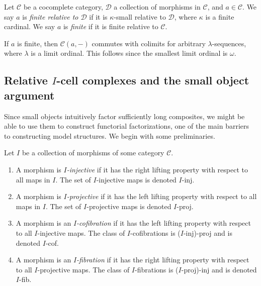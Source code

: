 \begin{definition}\label{4.1.6}
	Let $\mathcal{C} $ be a cocomplete category, $\mathcal{D} $ a collection of morphisms in $\mathcal{C} $, and $a\in \mathcal{C} $. We say $a$ is \emph{finite relative to $\mathcal{D} $} if it is $\kappa $-small relative to $\mathcal{D} $, where $\kappa $ is a finite cardinal. We say $a$ is \emph{finite} if it is finite relative to $\mathcal{C} $.
\end{definition}

If $a$ is finite, then $\mathcal{C} (a,-)$ commutes with colimits for arbitrary $\lambda $-sequences, where $\lambda $ is a limit ordinal. This follows since the smallest limit ordinal is $\omega $.

\subsection{Relative $I$-cell complexes and the small object argument}

Since small objects intuitively factor sufficiently long composites, we might be able to use them to construct functorial factorizations, one of the main barriers to constructing model structures. We begin with some preliminaries.

\begin{definition}\label{4.1.7}
	Let $I$ be a collection of morphisms of some category $\mathcal{C} $.
	\begin{enumerate}
		\item A morphism is \emph{$I$-injective} if it has the right lifting property with respect to all maps in $I$. The set of $I$-injective maps is denoted $I$-inj.
		\item A morphism is \emph{$I$-projective} if it has the left lifting property with respect to all maps in $I$. The set of $I$-projective maps is denoted $I$-proj.
		\item A morphism is an \emph{$I$-cofibration} if it has the left lifting property with respect to all $I$-injective maps. The class of $I$-cofibrations is ($I$-inj)-proj and is denoted $I$-cof.
		\item A morphism is an \emph{$I$-fibration} if it has the right lifting property with respect to all $I$-projective maps. The class of $I$-fibrations is ($I$-proj)-inj and is denoted $I$-fib.
	\end{enumerate}
\end{definition}

